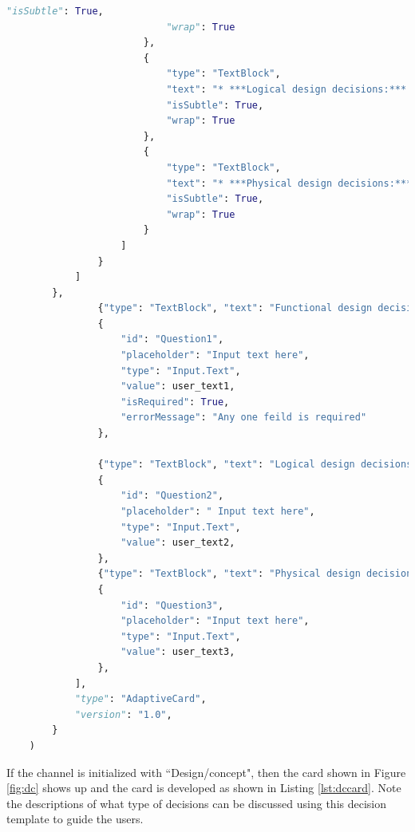 \begin{lstlisting}[caption={Architectural design card},label={lst:adcard},language=python]
                            "isSubtle": True,
                            "wrap": True
                        },
                        {
                            "type": "TextBlock",
                            "text": "* ***Logical design decisions:*** Decisions related to logical architecture describes a possible implementation of the functions with defined solution principles.",
                            "isSubtle": True,
                            "wrap": True
                        },
                        {
                            "type": "TextBlock",
                            "text": "* ***Physical design decisions:*** Decisions related to the physical element describes the actual implementation, e.g. technical elements with part numbers, concrete source code, etc.",
                            "isSubtle": True,
                            "wrap": True
                        }
                    ]
                }
            ]
        },
                {"type": "TextBlock", "text": "Functional design decisions:"},
                {
                    "id": "Question1",
                    "placeholder": "Input text here",
                    "type": "Input.Text",
                    "value": user_text1,
                    "isRequired": True,
                    "errorMessage": "Any one feild is required"
                },
                
                {"type": "TextBlock", "text": "Logical design decisions:"},
                {
                    "id": "Question2",
                    "placeholder": " Input text here",
                    "type": "Input.Text",
                    "value": user_text2,
                },
                {"type": "TextBlock", "text": "Physical design decisions:"},
                {
                    "id": "Question3",
                    "placeholder": "Input text here",
                    "type": "Input.Text",
                    "value": user_text3,
                },  
            ],
            "type": "AdaptiveCard",
            "version": "1.0",
        }
    )
\end{lstlisting}



If the channel is initialized with ``Design/concept", then the card shown in Figure \ref{fig:dc} shows up and the card is developed as shown in Listing \ref{lst:dccard}. Note the descriptions of what type of decisions can be discussed using this decision template to guide the users.



